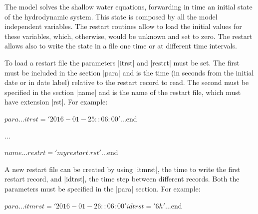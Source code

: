 
%
%
%
%
%
%
%

The model solves the shallow water equations, forwarding in time an
initial state of the hydrodynamic system. This state is composed by all
the model independent variables.  The restart routines allow to load the
initial values for these variables, which, otherwise, would be unknown
and set to zero.  The restart allows also to write the state in a file
one time or at different time intervals.

To load a restart file the parameters |itrst| and |restrt| must be
set. The first must be included in the section |para| and is the time (in
seconds from the initial date or in date label) relative to the restart
record to read.  The second must be specified in the section |name|
and is the name of the restart file, which must have extension |rst|.
For example:

\begin{code}
$para
...
itrst = '2016-01-25::06:00'
...
$end

...

$name
...
restrt = 'myrestart.rst'
...
$end
\end{code}

A new restart file can be created by using |itmrst|, the time to write
the first restart record, and |idtrst|, the time step between different
records. Both the parameters must be specified in the |para| section.
For example:

\begin{code}
$para
...
itmrst = '2016-01-26::06:00'
idtrst = '6h'
...
$end
\end{code}

